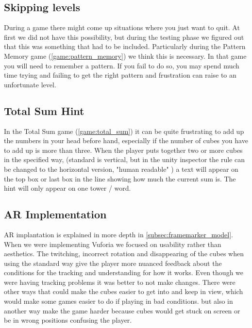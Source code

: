 \subsection{Skipping levels}
During a game there might come up situations where you just want to quit. At
first we did not have this possibility, but during the testing phase we figured
out that this was something that had to be included. Particularly during the
Pattern Memory game (\ref{game:pattern_memory}) we think this is necessary. In
that game you will need to remember a pattern. If you fail to do so, you may
spend much time trying and failing to get the right pattern and frustration can
raise to an unfortunate level. 

\subsection{Total Sum Hint}
In the Total Sum game (\ref{game:total_sum}) it can be quite frustrating to add up the numbers in your head before hand, especially if the number of cubes you have to add up is more than three. When the player puts together two or more cubes in the specified way, (standard is vertical, but in the unity inspector the rule can be changed to the horizontal version, "human readable" ) a text will appear on the top box or last box in the line showing how much the current sum is. The hint will only appear on one tower / word.

\subsection{AR Implementation}
AR implantation is explained in more depth in \ref{subsec:framemarker_model}.
When we were implementing Vuforia we focused on usability rather than aesthetics. The twitching, incorrect rotation and disappearing of the cubes when using the standard way give the player more nuanced feedback about the conditions for the tracking and understanding for how it works. Even though we were having tracking problems it was better to not make changes. There were other ways that could make the cubes easier to get into and keep in view, which would make some games easier to do if playing in bad conditions. but also in another way make the game harder because cubes would get stuck on screen or be in wrong positions confusing the player.



